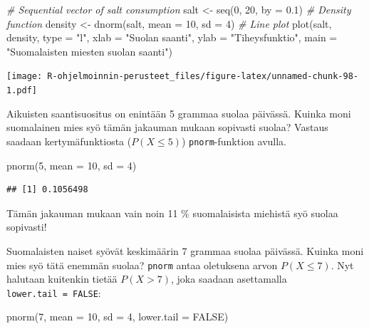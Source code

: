 \documentclass[
]{book}
\newenvironment{Shaded}{\begin{snugshade}}{\end{snugshade}}
\newcommand{\AttributeTok}[1]{\textcolor[rgb]{0.77,0.63,0.00}{#1}}
\newcommand{\CommentTok}[1]{\textcolor[rgb]{0.56,0.35,0.01}{\textit{#1}}}
\newcommand{\ConstantTok}[1]{\textcolor[rgb]{0.00,0.00,0.00}{#1}}
\newcommand{\DecValTok}[1]{\textcolor[rgb]{0.00,0.00,0.81}{#1}}
\newcommand{\FloatTok}[1]{\textcolor[rgb]{0.00,0.00,0.81}{#1}}
\newcommand{\FunctionTok}[1]{\textcolor[rgb]{0.00,0.00,0.00}{#1}}
\newcommand{\NormalTok}[1]{#1}
\newcommand{\OtherTok}[1]{\textcolor[rgb]{0.56,0.35,0.01}{#1}}
\newcommand{\StringTok}[1]{\textcolor[rgb]{0.31,0.60,0.02}{#1}}
\begin{document}
\begin{Shaded}
\begin{Highlighting}[]
\CommentTok{\# Sequential vector  of salt consumption}
\NormalTok{salt }\OtherTok{\textless{}{-}} \FunctionTok{seq}\NormalTok{(}\DecValTok{0}\NormalTok{, }\DecValTok{20}\NormalTok{, }\AttributeTok{by =} \FloatTok{0.1}\NormalTok{)}
\CommentTok{\# Density function}
\NormalTok{density }\OtherTok{\textless{}{-}} \FunctionTok{dnorm}\NormalTok{(salt, }\AttributeTok{mean =} \DecValTok{10}\NormalTok{, }\AttributeTok{sd =} \DecValTok{4}\NormalTok{)}
\CommentTok{\# Line plot}
\FunctionTok{plot}\NormalTok{(salt, density, }\AttributeTok{type =} \StringTok{"l"}\NormalTok{,}
     \AttributeTok{xlab =} \StringTok{"Suolan saanti"}\NormalTok{, }\AttributeTok{ylab =} \StringTok{"Tiheysfunktio"}\NormalTok{,}
     \AttributeTok{main =} \StringTok{"Suomalaisten miesten suolan saanti"}\NormalTok{)}
\end{Highlighting}
\end{Shaded}

\texttt{[image: R-ohjelmoinnin-perusteet\_files/figure-latex/unnamed-chunk-98-1.pdf]}

Aikuisten saantisuositus on enintään 5 grammaa suolaa päivässä. Kuinka moni suomalainen mies syö tämän jakauman mukaan sopivasti suolaa? Vastaus saadaan kertymäfunktiosta (\(P(X \leq 5)\)) \texttt{pnorm}-funktion avulla.

\begin{Shaded}
\begin{Highlighting}[]
\FunctionTok{pnorm}\NormalTok{(}\DecValTok{5}\NormalTok{, }\AttributeTok{mean =} \DecValTok{10}\NormalTok{, }\AttributeTok{sd =} \DecValTok{4}\NormalTok{)}
\end{Highlighting}
\end{Shaded}

\begin{verbatim}
## [1] 0.1056498
\end{verbatim}

Tämän jakauman mukaan vain noin 11 \% suomalaisista miehistä syö suolaa sopivasti!

Suomalaisten naiset syövät keskimäärin 7 grammaa suolaa päivässä. Kuinka moni mies syö tätä enemmän suolaa? \texttt{pnorm} antaa oletuksena arvon \(P(X \leq 7)\). Nyt halutaan kuitenkin tietää \(P(X > 7)\), joka saadaan asettamalla \texttt{lower.tail\ =\ FALSE}:

\begin{Shaded}
\begin{Highlighting}[]
\FunctionTok{pnorm}\NormalTok{(}\DecValTok{7}\NormalTok{, }\AttributeTok{mean =} \DecValTok{10}\NormalTok{, }\AttributeTok{sd =} \DecValTok{4}\NormalTok{, }\AttributeTok{lower.tail =} \ConstantTok{FALSE}\NormalTok{)}
\end{Highlighting}
\end{Shaded}
\end{document}
